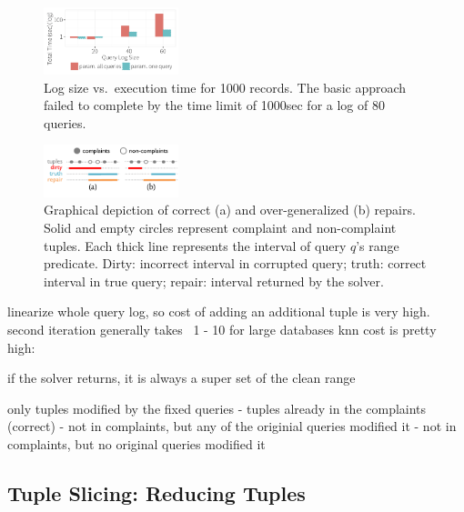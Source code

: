 \begin{figure}[t]
    \centering
    \includegraphics[width=0.35\textwidth]{figures/qsize_time_badscale}
    \vspace*{-0.1in}
    \caption{Log size vs.\ execution time for 1000 records. The basic approach failed to complete by the time limit of 1000sec for a log of $80$ queries.}
    \label{fig:querysize_vs_time}
\end{figure}

\begin{figure}[t]
    \centering
    \includegraphics[width=0.35\textwidth]{figures/2nditerationgroups}
    \vspace*{-2mm}
    \caption{
      Graphical depiction of correct (a) and over-generalized (b) repairs.
      Solid and empty circles represent complaint and non-complaint tuples.
      Each thick line represents the interval of query $q$'s range predicate.
      Dirty: incorrect interval in corrupted query;
      truth: correct interval in true query;
      repair: interval returned by the solver.}
    \label{fig:groups}
\end{figure}



linearize whole query log, so cost of adding an additional tuple is very high.
second iteration generally takes ~1 - 10
for large databases knn cost is pretty high: ~

if the solver returns, it is always a super set of the clean range

only tuples modified by the fixed queries
- tuples already in the complaints (correct)
- not in complaints, but any of the originial queries modified it
- not in complaints, but no original queries modified it
\fi



\subsection{Tuple Slicing: Reducing Tuples}
\label{sec:opt:tbsize}


